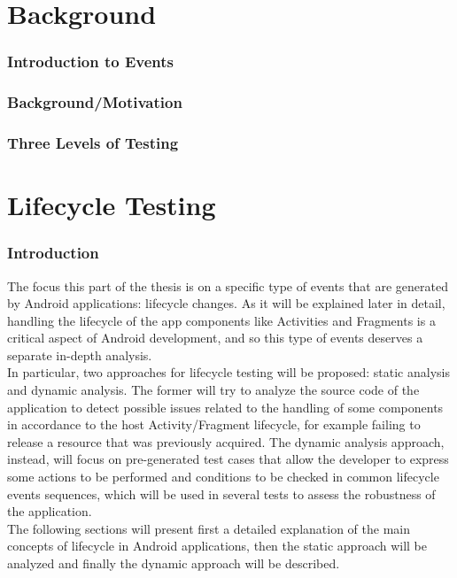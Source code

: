 \documentclass[11pt,a4paper,notitlepage]{article}
\begin{document}
\part{Background}

\section{Introduction to Events}

\section{Background/Motivation}

\section{Three Levels of Testing}



\part{Lifecycle Testing}

\section{Introduction}
The focus this part of the thesis is on a specific type of events that are generated by Android applications: lifecycle changes. As it will be explained later in detail, handling the lifecycle of the app components like Activities and Fragments is a critical aspect of Android development, and so this type of events deserves a separate in-depth analysis.\medskip \\
In particular, two approaches for lifecycle testing will be proposed: static analysis and dynamic analysis. The former will try to analyze the source code of the application to detect possible issues related to the handling of some components in accordance to the host Activity/Fragment lifecycle, for example failing to release a resource that was previously acquired. The dynamic analysis approach, instead, will focus on pre-generated test cases that allow the developer to express some actions to be performed and conditions to be checked in common lifecycle events sequences, which will be used in several tests to assess the robustness of the application.\medskip \\
The following sections will present first a detailed explanation of the main concepts of lifecycle in Android applications, then the static approach will be analyzed and finally the dynamic approach will be described.
\end{document}

